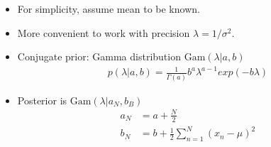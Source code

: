 \begin{itemize}
\item For simplicity, assume mean to be known.
\item More convenient to work with precision $\lambda=1/\sigma^2$.
\item Conjugate prior: Gamma distribution $\mbox{Gam}(\lambda|a,b)$
\begin{align}
p(\lambda|a, b)=\frac{1}{\Gamma(a)}b^a \lambda^{a-1} exp(-b\lambda)
\end{align}
\item Posterior is $\mbox{Gam}(\lambda|a_N,b_B)$
\begin{align}
a_N &= a + \frac{N}{2}\\
b_N &= b + \frac{1}{2} \sum_{n=1}^N (x_n -\mu)^2
\end{align}


\end{itemize}
